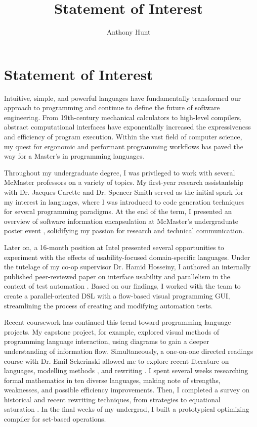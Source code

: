 \documentclass[11pt]{article}
\title{Statement of Interest}
\author{Anthony Hunt}
\begin{document}
\maketitle

\newpage

\section*{Statement of Interest}

Intuitive, simple, and powerful languages have fundamentally transformed our approach to programming and continue to define the future of software engineering. From 19th-century mechanical calculators to high-level compilers, abstract computational interfaces have exponentially increased the expressiveness and efficiency of program execution. Within the vast field of computer science, my quest for ergonomic and performant programming workflows has paved the way for a Master's in programming languages.

Throughout my undergraduate degree, I was privileged to work with several McMaster professors on a variety of topics. My first-year research assistantship with Dr. Jacques Carette and Dr. Spencer Smith served as the initial spark for my interest in languages, where I was introduced to code generation techniques for several programming paradigms. At the end of the term, I presented an overview of software information encapsulation at McMaster's undergraduate poster event \cite{hunt2021information}, solidifying my passion for research and technical communication.

Later on, a 16-month position at Intel presented several opportunities to experiment with the effects of usability-focused domain-specific languages. Under the tutelage of my co-op supervisor Dr. Hamid Hosseiny, I authored an internally published peer-reviewed paper on interface usability and parallelism in the context of test automation \cite{hunt2024memautogui}. Based on our findings, I worked with the team to create a parallel-oriented DSL with a flow-based visual programming GUI, streamlining the process of creating and modifying automation tests.

Recent coursework has continued this trend toward programming language projects. My capstone project, for example, explored visual methods of programming language interaction, using diagrams to gain a deeper understanding of information flow. Simultaneously, a one-on-one directed readings course with Dr. Emil Sekerinski allowed me to explore recent literature on languages, modelling methods \cite{eventBBook}, and rewriting \cite{baader1998term}. I spent several weeks researching formal mathematics in ten diverse languages, making note of strengths, weaknesses, and possible efficiency improvements. Then, I completed a survey on historical and recent rewriting techniques, from strategies \cite{elco1998building} to equational saturation \cite{tate2009equality}. In the final weeks of my undergrad, I built a prototypical optimizing compiler for set-based operations.
\end{document}
